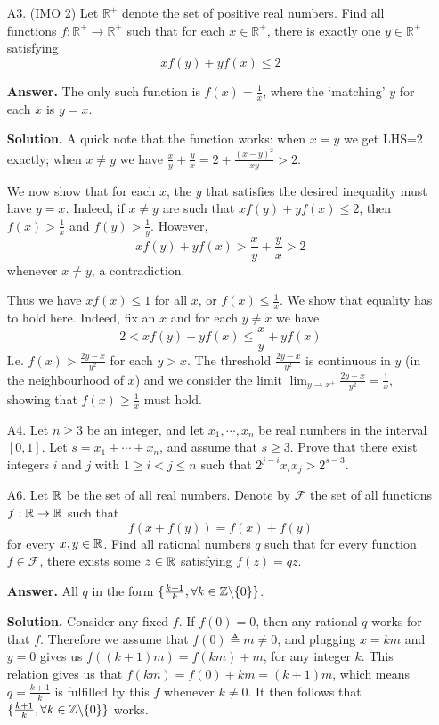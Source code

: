 \documentclass[11pt,a4paper]{article}
\begin{document}
\begin{enumerate}
		\item[A3.] (IMO 2)
		Let $\mathbb{R}^+$ denote the set of positive real numbers. Find all functions $f: \mathbb{R}^+ \to \mathbb{R}^+$ such that for each $x \in \mathbb{R}^+$, there is exactly one $y \in \mathbb{R}^+$ satisfying$$xf(y)+yf(x) \leq 2$$
		
		\textbf{Answer.} The only such function is $f(x) = \frac 1x$, where the `matching' $y$ for each $x$ is $y = x$. 
		
		\textbf{Solution.} 
		A quick note that the function works: when $x=y$ we get LHS=2 exactly; 
		when $x\neq y$ we have $\frac{x}{y}+\frac{y}{x} = 2 + \frac{(x-y)^2}{xy} > 2$. 
		
		We now show that for each $x$, the $y$ that satisfies the desired inequality must have $y = x$. 
		Indeed, if $x\neq y$ are such that $xf(y)+yf(x) \leq 2$, 
		then $f(x) > \frac 1x$ and $f(y) > \frac 1y$. 
		However, 
		\[
		xf(y)+yf(x) > \frac xy + \frac yx > 2
		\]
		whenever $x\neq y$, a contradiction. 
		
		Thus we have $xf(x)\le 1$ for all $x$, or $f(x)\le \frac 1x$. 
		We show that equality has to hold here. 
		Indeed, fix an $x$ and for each $y\neq x$ we have 
		\[
		2 < xf(y) + yf(x) \le \frac xy + yf(x)
		\]
		I.e. $f(x) > \frac{2y - x}{y^2}$ for each $y > x$. 
		The threshold $\frac{2y - x}{y^2}$ is continuous in $y$ (in the neighbourhood of $x$) and we consider the limit 
		$\lim_{y\to x^+} \frac{2y - x}{y^2} = \frac 1x$, 
		showing that $f(x)\ge \frac 1x$ must hold. 
		
		\item[A4.]
		Let $n \ge 3$ be an integer, and let $x_1, \cdots , x_n$ be real numbers in the interval $[0, 1]$. 
		Let $s=x_1+ \cdots +x_n$, and assume that $s\ge 3$. 
		Prove that there exist integers $i$ and $j$ with $1\ge i < j\le n$ such that
		$2^{j - i}x_ix_j > 2^{s - 3}$.
		
		\item[A6.]
		Let ${\mathbb R}$ be the set of all real numbers. 
		Denote by $\mathcal{F}$ the set of all functions $f: {\mathbb R}\to{\mathbb R}$ such that 
		\[
		f(x+f(y)) = f(x) + f(y)
		\]
		for every $x, y\in{\mathbb R}$. 
		Find all rational numbers $q$ such that for every function $f\in\mathcal{F}$, 
		there exists some $z\in{\mathbb R}$ satisfying $f(z)=qz$. 
		
		\textbf{Answer.}
		All $q$ in the form $\{\frac{k+1}{k}, \forall k\in{\mathbb Z}\backslash \{0\}\}$. 
		
		\textbf{Solution.}
		Consider any fixed $f$. If $f(0)=0$, then any rational $q$ works for that $f$. 
		Therefore we assume that $f(0)\triangleq m \neq 0$, 
		and plugging $x=km$ and $y=0$ gives us $f((k + 1)m) = f(km) + m$, for any integer $k$. 
		This relation gives us that $f(km) = f(0) + km = (k + 1)m$, 
		which means $q = \frac{k + 1}{k}$ is fulfilled by this $f$ whenever $k\neq 0$. 
		It then follows that $\{\frac{k+1}{k}, \forall k\in{\mathbb Z}\backslash \{0\}\}$ works. 
		

\end{enumerate}
\end{document}
